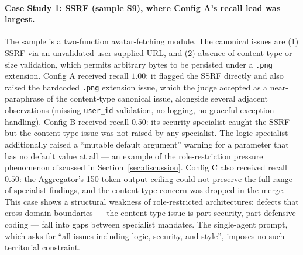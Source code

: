 \documentclass[pdflatex,sn-mathphys-num]{sn-jnl}
\theoremstyle{thmstyleone}
\theoremstyle{thmstyletwo}
\theoremstyle{thmstylethree}
\begin{document}
\paragraph{Case Study 1: SSRF (sample S9), where Config A's recall lead was largest.} The sample is a two-function avatar-fetching module. The canonical issues are (1) SSRF via an unvalidated user-supplied URL, and (2) absence of content-type or size validation, which permits arbitrary bytes to be persisted under a \texttt{.png} extension. Config A received recall $1.00$: it flagged the SSRF directly and also raised the hardcoded \texttt{.png} extension issue, which the judge accepted as a near-paraphrase of the content-type canonical issue, alongside several adjacent observations (missing \texttt{user\_id} validation, no logging, no graceful exception handling). Config B received recall $0.50$: its security specialist caught the SSRF but the content-type issue was not raised by any specialist. The logic specialist additionally raised a ``mutable default argument'' warning for a parameter that has no default value at all --- an example of the role-restriction pressure phenomenon discussed in Section~\ref{sec:discussion}. Config C also received recall $0.50$: the Aggregator's 150-token output ceiling could not preserve the full range of specialist findings, and the content-type concern was dropped in the merge. This case shows a structural weakness of role-restricted architectures: defects that cross domain boundaries --- the content-type issue is part security, part defensive coding --- fall into gaps between specialist mandates. The single-agent prompt, which asks for ``all issues including logic, security, and style'', imposes no such territorial constraint.
\end{document}
